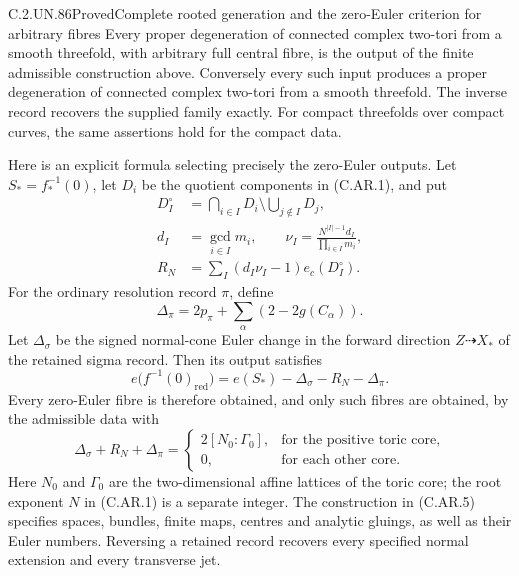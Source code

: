 \begin{statement}{C.2.UN.86}{Proved}{Complete rooted generation and the zero-Euler criterion for arbitrary fibres}
Every proper degeneration of connected complex two-tori
from a smooth threefold, with arbitrary full central
fibre, is the output of the finite admissible construction
above. Conversely every such input produces a proper
degeneration of connected complex two-tori from a smooth
threefold. The inverse record recovers the supplied
family exactly. For compact threefolds over compact
curves, the same assertions hold for the compact data.

Here is an explicit formula selecting precisely the
zero-Euler outputs. Let \(S_*=f_*^{-1}(0)\), let
\(D_i\) be the quotient components in (C.AR.1), and put
\[
 \begin{split}
 D_I^\circ&=\bigcap_{i\in I}D_i
                    \setminus\bigcup_{j\notin I}D_j,\\
 d_I&=\gcd_{i\in I}m_i,\qquad
 \nu_I=\frac{N^{|I|-1}d_I}{\prod_{i\in I}m_i},\\
 R_N&=\sum_I(d_I\nu_I-1)e_c(D_I^\circ).
 \end{split}
 \tag{C.AR.2}
\]
For the ordinary resolution record \(\pi\), define
\[
 \Delta_\pi=2p_\pi+\sum_\alpha(2-2g(C_\alpha)).
 \tag{C.AR.3}
\]
Let \(\Delta_\sigma\) be the signed normal-cone Euler
change in the forward direction \(Z\dashrightarrow X_*\)
of the retained sigma record. Then its output satisfies
\[
 e\bigl(f^{-1}(0)_{\mathrm{red}}\bigr)
       =e(S_*)-\Delta_\sigma-R_N-\Delta_\pi.
 \tag{C.AR.4}
\]
Every zero-Euler fibre is therefore obtained, and only
such fibres are obtained, by the admissible data with
\[
 \Delta_\sigma+R_N+\Delta_\pi=
 \begin{cases}
  2[N_0:\Gamma_0],&\text{for the positive toric core},\\
  0,&\text{for each other core}.
 \end{cases}
 \tag{C.AR.5}
\]
Here \(N_0\) and \(\Gamma_0\) are the two-dimensional
affine lattices of the toric core; the root exponent
\(N\) in (C.AR.1) is a separate integer. The construction
in (C.AR.5) specifies spaces, bundles, finite maps,
centres and analytic gluings, as well as their Euler
numbers. Reversing a retained record recovers every
specified normal extension and every transverse jet.


\end{statement}
